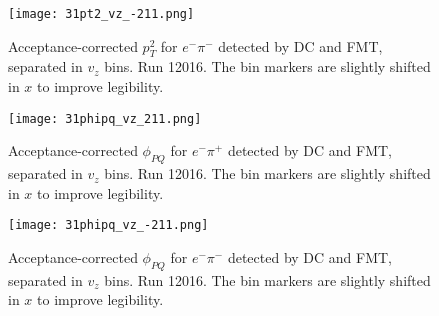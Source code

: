     \begin{figure}
        \centering
        \texttt{[image: 31pt2\_vz\_-211.png]}
        \caption[Acceptance-corrected $p_T^2$ for $e^-\pi^-$ separated in $v_z$ bins]
        {Acceptance-corrected $p_T^2$ for $e^-\pi^-$ detected by DC and FMT, separated in $v_z$ bins.
        Run 12016.
        The bin markers are slightly shifted in $x$ to improve legibility.}
        \label{fig::14.31::pt2_-211_vz}
    \end{figure}

    \begin{figure}
        \centering
        \texttt{[image: 31phipq\_vz\_211.png]}
        \caption[Acceptance-corrected $\phi_{PQ}$ for $e^-\pi^+$ separated in $v_z$ bins]
        {Acceptance-corrected $\phi_{PQ}$ for $e^-\pi^+$ detected by DC and FMT, separated in $v_z$ bins.
        Run 12016.
        The bin markers are slightly shifted in $x$ to improve legibility.}
        \label{fig::14.31::phipq_211_vz}
    \end{figure}

    \begin{figure}
        \centering
        \texttt{[image: 31phipq\_vz\_-211.png]}
        \caption[Acceptance-corrected $\phi_{PQ}$ for $e^-\pi^-$ separated in $v_z$ bins]
        {Acceptance-corrected $\phi_{PQ}$ for $e^-\pi^-$ detected by DC and FMT, separated in $v_z$ bins.
        Run 12016.
        The bin markers are slightly shifted in $x$ to improve legibility.}
        \label{fig::14.31::phipq_-211_vz}
    \end{figure}

